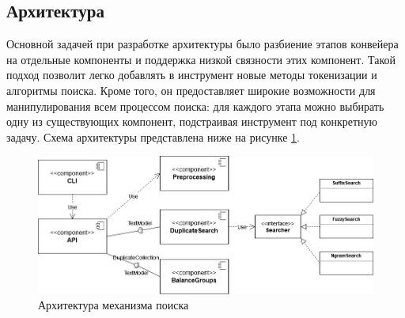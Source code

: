 \documentclass[14pt]{matmex-diploma-custom}
\begin{document}
\subsection{Архитектура}

Основной задачей при разработке архитектуры было разбиение этапов конвейера на отдельные компоненты и поддержка низкой связности этих компонент. Такой подход позволит легко добавлять в инструмент новые методы токенизации и алгоритмы поиска. Кроме того, он предоставляет широкие возможности для манипулирования всем процессом поиска: для каждого этапа можно выбирать одну из существующих компонент, подстраивая инструмент под конкретную задачу. Схема архитектуры представлена ниже на рисунке \ref{fig:Architecture}.

\begin{figure}[h!]
	\includegraphics[scale=0.53]{pictures/Architecture.png}
	\centering
	\caption{Архитектура механизма поиска}
	\label{fig:Architecture}
\end{figure}





\end{document}

